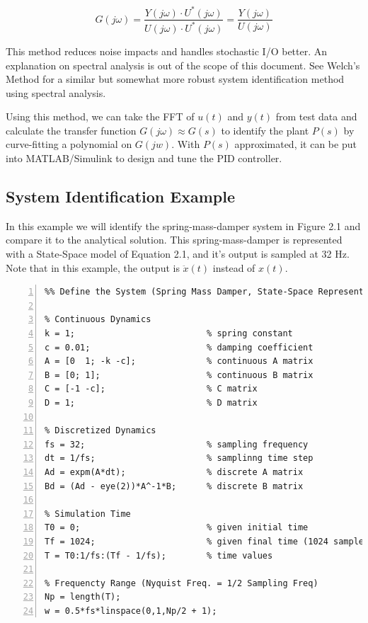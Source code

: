 \documentclass{article}
\begin{document}
\begin{equation}
    G(j\omega)=\frac{Y(j\omega)\cdot U^*(j\omega)}{U(j\omega)\cdot U^*(j\omega)}=\frac{Y(j\omega)}{U(j\omega)}
\end{equation}

This method reduces noise impacts and handles stochastic I/O better. An explanation on spectral analysis is out of the scope of this document. See Welch's Method for a similar but somewhat more robust system identification method using spectral analysis.

Using this method, we can take the FFT of $u(t)$ and $y(t)$ from test data and calculate the transfer function $G(j\omega) \approx G(s)$ to identify the plant $P(s)$ by curve-fitting a polynomial on $G(jw)$. With $P(s)$ approximated, it can be put into MATLAB/Simulink to design and tune the PID controller.

\subsection{System Identification Example}


In this example we will identify the spring-mass-damper system in Figure 2.1 and compare it to the analytical solution. This spring-mass-damper is represented with a State-Space model of Equation 2.1, and it's output is sampled at 32 Hz. Note that in this example, the output is $\ddot{x}(t)$ instead of $x(t)$.

\begin{lstlisting}[style=Matlab-editor, caption={\texttt{Defining The System}},frame=single, numbers=left]
%%%%%%%%%%%%%%%%%%%%%%%%%%%%%%%%%%%%%%%%%%%%%%%%%%%%%%%%%%%%%%%%%%%%%%%
%% Define the System (Spring Mass Damper, State-Space Representation) 

% Continuous Dynamics
k = 1;                          % spring constant
c = 0.01;                       % damping coefficient
A = [0  1; -k -c];              % continuous A matrix
B = [0; 1];                     % continuous B matrix
C = [-1 -c];                    % C matrix
D = 1;                          % D matrix

% Discretized Dynamics
fs = 32;                        % sampling frequency
dt = 1/fs;                      % samplinng time step
Ad = expm(A*dt);                % discrete A matrix
Bd = (Ad - eye(2))*A^-1*B;      % discrete B matrix

% Simulation Time
T0 = 0;                         % given initial time
Tf = 1024;                      % given final time (1024 samples)
T = T0:1/fs:(Tf - 1/fs);        % time values

% Frequencty Range (Nyquist Freq. = 1/2 Sampling Freq)
Np = length(T);
w = 0.5*fs*linspace(0,1,Np/2 + 1);  

\end{lstlisting}
\end{document}
